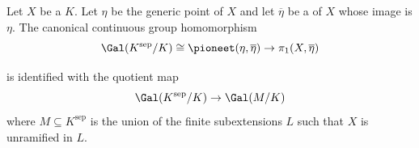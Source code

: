 \begin{proposition} \label{proposition:mor_from_et_fund_grp_of_gen_pt_of_norm_int_sch_to_et_fund_grp_of_scheme_is_quo_map_of_gal_grp_of_sep_clos_of_func_field_to_gal_grp_of_max_unr_ext}
    Let $X$ be a    $K$. Let $\eta$ be the generic point of $X$ and let $\overline{\eta}$ be a  of $X$ whose image is $\eta$. 
    The canonical continuous group homomorphism
    $$\Gal(K^\text{sep} / K) \cong \pioneet(\eta, \overline{\eta}) \to \pi_1(X, \overline{\eta})$$

    is identified with the quotient map 
    $$\Gal(K^\text{sep} / K) \to \Gal(M/K)$$
    where $M \subseteq K^{\text{sep}}$ is the union of the finite subextensions $L$ such that $X$ is unramified in $L$. 
\end{proposition}